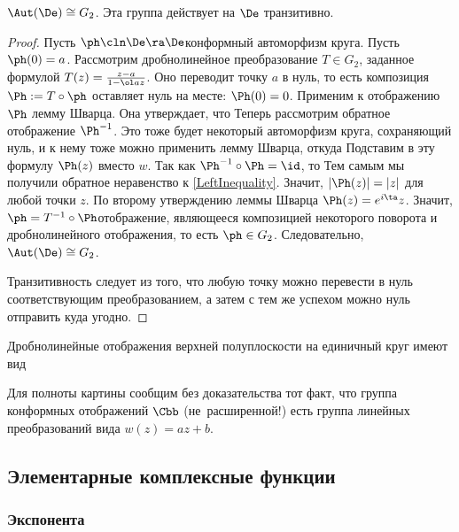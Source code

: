 \documentclass[a4paper]{article}
\begin{document}
\begin{theorem}
$\Aut(\De) \cong G_2$. Эта группа действует на $\De$ транзитивно.
\end{theorem}
\begin{proof}
Пусть $\ph\cln\De\ra\De$\т конформный автоморфизм круга. Пусть $\ph(0)=a$. Рассмотрим дробно\д линейное преобразование
$T\in G_2$, заданное формулой $T(z) = \frac{z-a}{1-\ol a z}$. Оно переводит точку $a$ в нуль, то есть
композиция $\Ph := T \circ \ph$ оставляет нуль на месте: $\Ph(0)=0$. Применим к отображению $\Ph$ лемму Шварца.
Она утверждает, что
Теперь рассмотрим обратное отображение $\Ph^{-1}$. Это тоже будет некоторый
автоморфизм круга, сохраняющий нуль, и к нему тоже можно применить лемму Шварца, откуда
Подставим в эту формулу $\Ph(z)$ вместо $w$. Так как $\Ph^{-1} \circ \Ph = \id$, то
Тем самым мы получили обратное неравенство к \eqref{LeftInequality}. Значит, $|\Ph(z)|=|z|$ для любой точки $z$.
По второму утверждению леммы Шварца $\Ph(z)=e^{i\ta}z$. Значит, $\ph = T^{-1}\circ \Ph$\т отображение, являющееся
композицией некоторого поворота и дробно\д линейного отображения, то есть $\ph \in G_2$. Следовательно, $\Aut(\De) \cong G_2$.

Транзитивность следует из того, что любую точку можно перевести в нуль соответствующим преобразованием,
а затем с тем же успехом можно нуль отправить куда угодно.
\end{proof}

Дробно\д линейные отображения верхней полуплоскости на единичный круг имеют вид

Для полноты картины сообщим без доказательства  тот факт, что группа конформных отображений $\Cbb$ (не~расширенной!)
есть группа линейных преобразований вида $w(z)=az+b$.

\subsection{Элементарные комплексные функции}

\subsubsection{Экспонента}

\begin{df}
\end{df}
\end{document}
